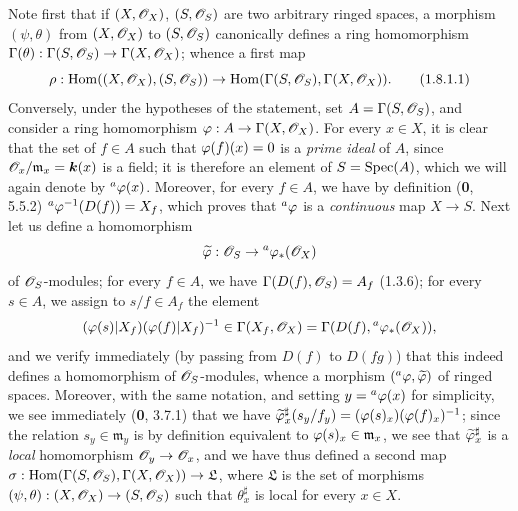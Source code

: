 Note first that if $(X,\mathscr{O}_X)$, $(S,\mathscr{O}_S)$ are two arbitrary
ringed spaces, a morphism $(\psi,\theta)$ from $(X,\mathscr{O}_X)$
to $(S,\mathscr{O}_S)$ canonically defines a ring homomorphism
$\Gamma(\theta):\Gamma(S,\mathscr{O}_S)\to\Gamma(X,\mathscr{O}_X)$; whence a
first map
\begin{equation}
\label{ega2:addendum:I.1.8.1.1}
  \rho:\operatorname{Hom}((X,\mathscr{O}_X),(S,\mathscr{O}_S))
  \to\operatorname{Hom}(\Gamma(S,\mathscr{O}_S),\Gamma(X,\mathscr{O}_X)).
\tag{1.8.1.1}
\end{equation}
Conversely, under the hypotheses of the statement, set
$A=\Gamma(S,\mathscr{O}_S)$, and consider a ring homomorphism
$\varphi:A\to\Gamma(X,\mathscr{O}_X)$. For every $x\in X$, it is clear that
the set of $f\in A$ such that $\varphi(f)(x)=0$ is a \emph{prime ideal}
of $A$, since $\mathscr{O}_x/\mathfrak m_x=\boldsymbol{k}(x)$ is a field; it is
therefore an element of $S=\operatorname{Spec}(A)$, which we will again denote by
${}^a\varphi(x)$. Moreover, for every $f\in A$, we have by definition
(\textbf{0}, 5.5.2) ${}^a\varphi^{-1}(D(f))=X_f$,
which proves that ${}^a\varphi$ is a \emph{continuous} map $X\to S$.
Next let us define a homomorphism
\[
  \widetilde{\varphi}:\mathscr{O}_S\to{}^a\varphi_*(\mathscr{O}_X)
\]
of $\mathscr{O}_S$-modules; for every $f\in A$, we have
$\Gamma(D(f),\mathscr{O}_S)=A_f$ (1.3.6); for every $s\in A$, we assign
to $s/f\in A_f$ the element
\[
  (\varphi(s)|X_f)(\varphi(f)|X_f)^{-1}
  \in\Gamma(X_f,\mathscr{O}_X)
  =\Gamma(D(f),{}^a\varphi_*(\mathscr{O}_X)),
\]
and we verify immediately (by passing from $D(f)$ to $D(fg)$) that this
indeed defines a homomorphism of $\mathscr{O}_S$-modules, whence a morphism
$({}^a\varphi,\widetilde{\varphi})$ of ringed spaces. Moreover, with the
same notation, and setting $y={}^a\varphi(x)$ for simplicity, we see
immediately (\textbf{0}, 3.7.1) that we have $\widetilde{\varphi}_x^\sharp(s_y/f_y)=(\varphi(s)_x)(\varphi(f)_x)^{-1}$;
since the relation $s_y\in\mathfrak m_y$ is by definition equivalent
to $\varphi(s)_x\in\mathfrak m_x$, we see that
$\widetilde{\varphi}_x^\sharp$ is a \emph{local} homomorphism
$\mathscr{O}_y\to\mathscr{O}_x$, and we have thus defined a second map $\sigma:\operatorname{Hom}(\Gamma(S,\mathscr{O}_S),\Gamma(X,\mathscr{O}_X))\to\mathfrak L$,
where $\mathfrak L$ is the set of morphisms
$(\psi,\theta):(X,\mathscr{O}_X)\to(S,\mathscr{O}_S)$ such that
$\theta_x^\sharp$ is local for every $x\in X$.

